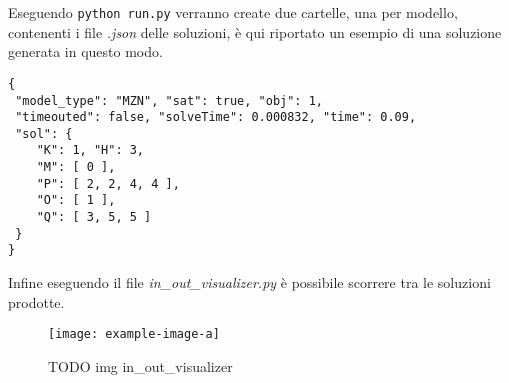 Eseguendo \lstinline{python run.py} verranno create due cartelle, una per modello, contenenti i file \emph{.json} delle soluzioni, è qui riportato un esempio di una soluzione generata in questo modo.
\begin{lstlisting}
{
 "model_type": "MZN", "sat": true, "obj": 1,      
 "timeouted": false, "solveTime": 0.000832, "time": 0.09,
 "sol": {
    "K": 1, "H": 3,
    "M": [ 0 ],
    "P": [ 2, 2, 4, 4 ],
    "O": [ 1 ],
    "Q": [ 3, 5, 5 ]
 }
}
\end{lstlisting}

Infine eseguendo il file \emph{in\_out\_visualizer.py} è possibile scorrere tra le soluzioni prodotte.
\begin{figure}[ht]
  \centering
  \texttt{[image: example-image-a]}
  \caption{TODO img in\_out\_visualizer}
\end{figure}
